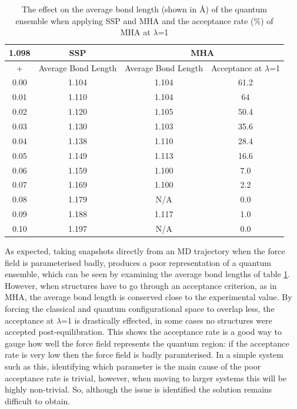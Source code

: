 \begin{center}
\begin{table}[ht]
{
\hfill{}
\begin{tabular}{c | c | c | c}
\hline 
1.098 & SSP & \multicolumn{2}{c}{MHA} \\ 
\hline 
+ & Average Bond Length & Average Bond Length & Acceptance at $\lambda$=1 \\ 
\hline 
0.00 & 1.104 & 1.104 & 61.2 \\ 
\hline
0.01 & 1.110 & 1.104 & 64 \\ 
\hline 
0.02 & 1.120 & 1.105 & 50.4 \\ 
\hline 
0.03 & 1.130 & 1.103 & 35.6 \\ 
\hline 
0.04 & 1.138 & 1.110 & 28.4 \\ 
\hline 
0.05 & 1.149 & 1.113 & 16.6 \\ 
\hline 
0.06 & 1.159 & 1.100 & 7.0 \\ 
\hline 
0.07 & 1.169 & 1.100 & 2.2 \\ 
\hline 
0.08 & 1.179 & N/A & 0.0 \\ 
\hline 
0.09 & 1.188 & 1.117 & 1.0 \\ 
\hline 
0.10 & 1.197 & N/A & 0.0 \\ 
\hline 
\end{tabular}}
\hfill{}
\caption{The effect on the average bond length (shown in \AA) of the quantum ensemble when applying SSP and MHA and the acceptance rate (\%) of MHA at $\lambda$=1}
\label{table:N2_force_field}
\end{table}
\end{center}

As expected, taking snapshots directly from an MD trajectory when the force field is parameterised badly, produces a poor representation of a quantum ensemble, which can be seen by examining the average bond lengths of table \ref{table:N2_force_field}.  However, when structures have to go through an acceptance criterion, as in MHA, the average bond length is conserved close to the experimental value.  By forcing the classical and quantum configurational space to overlap less, the acceptance at $\lambda$=1 is drastically effected, in some cases no structures were accepted post-equilibration.   This shows the acceptance rate is a good way to gauge how well the force field represents the quantum region: if the acceptance rate is very low then the force field is badly paramterised.  In a simple system such as this, identifying which parameter is the main cause of the poor acceptance rate is trivial, however, when moving to larger systems this will be highly non-trivial.  So, although the issue is identified the solution remains difficult to obtain.

